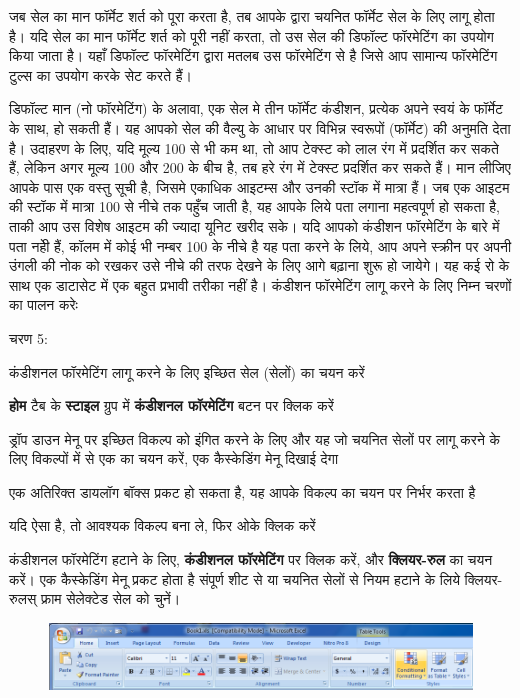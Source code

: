 जब सेल का मान फॉर्मेट शर्त को पूरा करता है, तब आपके द्वारा चयनित फॉर्मेट सेल के लिए लागू होता है। यदि सेल का मान फॉर्मेट शर्त को पूरी नहीं करता, तो उस सेल की डिफॉल्ट फॉरमेटिंग का उपयोग किया जाता है। यहाँ डिफॉल्ट फॉरमेटिंग द्वारा मतलब उस फॉरमेटिंग से है जिसे आप सामान्य फॉरमेटिंग टुल्स का उपयोग करके सेट करते हैं।

डिफॉल्ट मान (नो फॉरमेटिंग) के अलावा, एक सेल मे तीन फॉर्मेट कंडीशन, प्रत्येक अपने स्वयं के फॉर्मेट के साथ, हो सकती हैं। यह आपको सेल की वैल्यु के आधार पर विभिन्न स्वरूपों (फॉर्मेट) की अनुमति देता है। उदाहरण के लिए, यदि मूल्य 100 से भी कम था, तो आप टेक्स्ट को लाल रंग में प्रदर्शित कर सकते हैं, लेकिन अगर मूल्य 100 और 200 के बीच है, तब हरे रंग में टेक्स्ट प्रदर्शित कर सकते हैं। मान लीजिए आपके पास एक वस्तु सूची है, जिसमे एकाधिक आइटम्स और उनकी स्टॉक में मात्रा हैं। जब एक आइटम की स्टॉक में मात्रा 100 से नीचे तक पहुँच जाती है, यह आपके लिये पता लगाना महत्वपूर्ण हो सकता है, ताकी आप उस विशेष आइटम की ज्यादा यूनिट खरीद सके। यदि आपको कंडीशन फॉरमेटिंग के बारे में पता नहीे हैं, कॉलम में कोई भी नम्बर 100 के नीचे है यह पता करने के लिये, आप अपने स्क्रीन पर अपनी उंगली की नोक को रखकर उसे नीचे की तरफ देखने के लिए आगे बढ़ाना शुरू हो जायेगे। यह कई रो के साथ एक डाटासेट में एक बहुत प्रभावी तरीका नहीं है। कंडीशन फॉरमेटिंग लागू करने के लिए निम्न चरणों का पालन करेः
\begin{descriptionSimple}{चरण 5:}
\item[चरण 1] कंडीशनल फॉरमेटिंग लागू करने के लिए इच्छित सेल (सेलों) का चयन करें
\item[चरण 2] \textbf{होम} टैब के \textbf{स्टाइल} ग्रुप में \textbf{कंडीशनल फॉरमेटिंग} बटन पर क्लिक करें
\item[चरण 3] ड्रॉप डाउन मेनू पर इच्छित विकल्प को इंगित करने के लिए और यह जो चयनित सेलों पर लागू करने के लिए विकल्पों में से एक का चयन करें, एक कैस्केडिंग मेनू दिखाई देगा
\item[चरण 4] एक अतिरिक्त डायलॉग बॉक्स प्रकट हो सकता है, यह आपके विकल्प का चयन पर निर्भर करता है
\item[चरण 5] यदि ऐसा है, तो आवश्यक विकल्प बना ले, फिर ओके क्लिक करें
\end{descriptionSimple}

कंडीशनल फॉरमेटिंग हटाने के लिए, \textbf{कंडीशनल फॉरमेटिंग} पर क्लिक करें, और \textbf{क्लियर-रुल} का  चयन करें। एक कैस्केडिंग मेनू प्रकट होता है संपूर्ण शीट से या चयनित सेलों से नियम हटाने के लिये क्लियर-रुलस् फ्राम सेलेक्टेड सेल को चुनें।

\begin{figure}[H]
\centering
\includegraphics[scale=.42]{src/images/chapter2/chapter2_fig21.png}
\end{figure}

